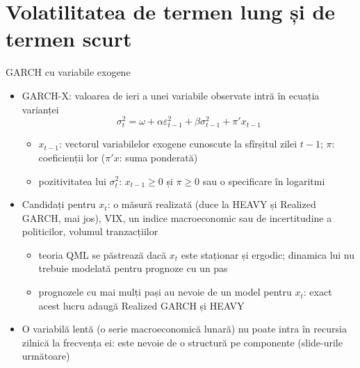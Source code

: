 \section{Volatilitatea de termen lung și de termen scurt}

\begin{frame}{GARCH cu variabile exogene}
\itemsize{\small}
\begin{itemize}
    \item GARCH-X: valoarea de ieri a unei variabile observate intră în ecuația varianței
    \[ \sigma^2_t = \omega + \alpha\varepsilon^2_{t-1} + \beta\sigma^2_{t-1} + \pi'x_{t-1} \]
    \begin{itemize}
        \item $x_{t-1}$: vectorul variabilelor exogene cunoscute la sfîrșitul zilei $t-1$; $\pi$: coeficienții lor ($\pi'x$: suma ponderată)
        \item pozitivitatea lui $\sigma^2_t$: $x_{t-1} \ge 0$ și $\pi \ge 0$ sau o specificare în logaritmi
    \end{itemize}
    \item Candidați pentru $x_t$: o măsură realizată (duce la HEAVY și Realized GARCH, mai jos), VIX, un indice macroeconomic sau de incertitudine a politicilor, volumul tranzacțiilor
    \begin{itemize}
        \item teoria QML se păstrează dacă $x_t$ este staționar și ergodic; dinamica lui nu trebuie modelată pentru prognoze cu un pas
        \item prognozele cu mai mulți pași au nevoie de un model pentru $x_t$: exact acest lucru adaugă Realized GARCH și HEAVY
    \end{itemize}
    \item O variabilă lentă (o serie macroeconomică lunară) nu poate intra în recursia zilnică la frecvența ei: este nevoie de o structură pe componente (slide-urile următoare)
\end{itemize}
\end{frame}


